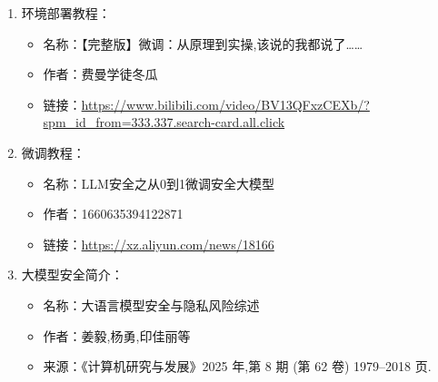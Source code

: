 \documentclass[12pt]{ctexart}
\begin{document}
\begin{enumerate}

    \item 环境部署教程：

          \begin{itemize}

              \item 名称：【完整版】微调：从原理到实操,该说的我都说了……

              \item 作者：费曼学徒冬瓜

              \item 链接：\url{https://www.bilibili.com/video/BV13QFxzCEXb/?spm_id_from=333.337.search-card.all.click}

          \end{itemize}

    \item 微调教程：

          \begin{itemize}

              \item 名称：LLM安全之从0到1微调安全大模型

              \item 作者：1660635394122871

              \item 链接：\url{https://xz.aliyun.com/news/18166}

          \end{itemize}

    \item 大模型安全简介：

          \begin{itemize}

              \item 名称：大语言模型安全与隐私风险综述

              \item 作者：姜毅,杨勇,印佳丽等

              \item 来源：《计算机研究与发展》2025 年,第 8 期 (第 62 卷) 1979–2018 页.

          \end{itemize}

\end{enumerate}
\end{document}
